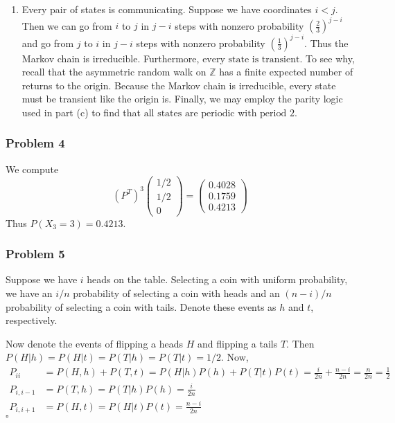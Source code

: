 \documentclass[letterpaper,12pt]{article}
\renewcommand*{\qed}{\hfill\ensuremath{\square}}
\begin{document}
\begin{flushleft}
\begin{enumerate}[label=(\alph*)]
        \item
        Every pair of states is communicating. Suppose we have coordinates $i < j$. Then we can go from $i$ to $j$ in $j - i$ steps with nonzero probability $\left(\frac{2}{3}\right)^{j - i}$ and go from $j$ to $i$ in $j - i$ steps with nonzero probability $\left(\frac{1}{3}\right)^{j - i}$. Thus the Markov chain is $\boxed{\text{irreducible}}$. Furthermore, $\boxed{\text{every state is transient}}$. To see why, recall that the asymmetric random walk on $\mathbb{Z}$ has a finite expected number of returns to the origin. Because the Markov chain is irreducible, every state must be transient like the origin is. Finally, we may employ the parity logic used in part (c) to find that $\boxed{\text{all states are periodic with period 2}}$.

    \end{enumerate}

    \subsubsection*{Problem 4}
    We compute
    $$(P^T)^3 \begin{pmatrix} 1/2 \\ 1/2 \\ 0 \end{pmatrix} = \begin{pmatrix} 0.4028 \\ 0.1759 \\ 0.4213 \end{pmatrix}$$
    Thus $\boxed{P(X_3 = 3) = 0.4213}$.

    \subsubsection*{Problem 5}
    Suppose we have $i$ heads on the table. Selecting a coin with uniform probability, we have an $i/n$ probability of selecting a coin with heads and an $(n-i)/n$ probability of selecting a coin with tails. Denote these events as $h$ and $t$, respectively.

    Now denote the events of flipping a heads $H$ and flipping a tails $T$. Then $P(H | h) = P(H | t) = P(T | h) = P(T | t) = 1/2$. Now,
    \begin{align*}
        P_{ii} &= P(H, h) + P(T, t) = P(H | h)P(h) + P(T | t)P(t) = \frac{i}{2n} + \frac{n - i}{2n} = \frac{n}{2n} = \frac{1}{2} \\
        P_{i,i-1} &= P(T, h) = P(T | h)P(h) = \frac{i}{2n} \\
        P_{i,i+1} &= P(H, t) = P(H | t)P(t) = \frac{n - i}{2n}
    \end{align*}
    \qed


\end{flushleft}
\end{document}
